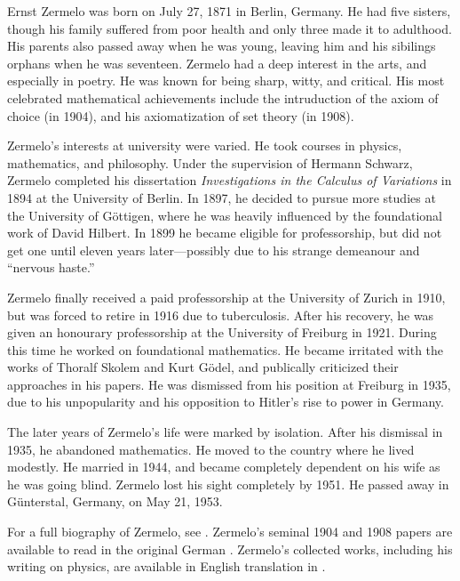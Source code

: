 \documentclass[../../../include/open-logic-section]{subfiles}
\begin{document}



Ernst Zermelo was born on July 27, 1871 in Berlin, Germany. He had
five sisters, though his family suffered from poor health and only
three made it to adulthood. His parents also passed away when he was
young, leaving him and his sibilings orphans when he was seventeen.
Zermelo had a deep interest in the arts, and especially in poetry. He
was known for being sharp, witty, and critical. His most celebrated
mathematical achievements include the intruduction of the axiom of
choice (in 1904), and his axiomatization of set theory (in 1908).

Zermelo's interests at university were varied. He took courses in
physics, mathematics, and philosophy. Under the supervision of Hermann
Schwarz, Zermelo completed his dissertation \emph{Investigations in
  the Calculus of Variations} in 1894 at the University of Berlin. In
1897, he decided to pursue more studies at the University of
G\"{o}ttigen, where he was heavily influenced by the foundational work
of David Hilbert. In 1899 he became eligible for professorship, but
did not get one until eleven years later---possibly due to his strange
demeanour and ``nervous haste.''

Zermelo finally received a paid professorship at the University of
Zurich in 1910, but was forced to retire in 1916 due to
tuberculosis. After his recovery, he was given an honourary
professorship at the University of Freiburg in 1921. During this time
he worked on foundational mathematics.  He became irritated with the
works of Thoralf Skolem and Kurt G\"{o}del, and publically criticized
their approaches in his papers.  He was dismissed from his position at
Freiburg in 1935, due to his unpopularity and his opposition to
Hitler's rise to power in Germany.
 
The later years of Zermelo's life were marked by isolation. After his
dismissal in 1935, he abandoned mathematics. He moved to the country
where he lived modestly. He married in 1944, and became completely
dependent on his wife as he was going blind. Zermelo lost his sight
completely by 1951. He passed away in G\"{u}nterstal, Germany, on May
21, 1953.

\begin{reading}
For a full biography of Zermelo, see \citet{Ebbinghaus2015}.
Zermelo's seminal 1904 and 1908 papers are available to read in the
original German \citep{Zermelo1904,Zermelo1908}.  Zermelo's collected
works, including his writing on physics, are available in English
translation in \citet{Ebbinghaus2010,Ebbinghaus2013}.
\end{reading}
\end{document}
